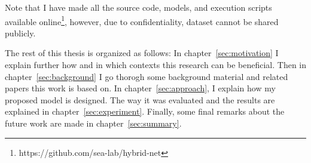 Note that I have made all the source code, models, and execution scripts available online\footnote{https://github.com/sea-lab/hybrid-net}, however, due to confidentiality, dataset cannot be shared publicly. 

The rest of this thesis is organized as follows: In chapter~\ref{sec:motivation} I explain further how and in which contexts this research can be beneficial. 
Then in chapter~\ref{sec:background} I go thorogh some background material and related papers this work is based on. 
In chapter~\ref{sec:approach}, I explain how my proposed model is designed. The way it was evaluated and the results are explained in chapter~\ref{sec:experiment}. 
Finally,
some final remarks about the future work are made in chapter~\ref{sec:summary}.
